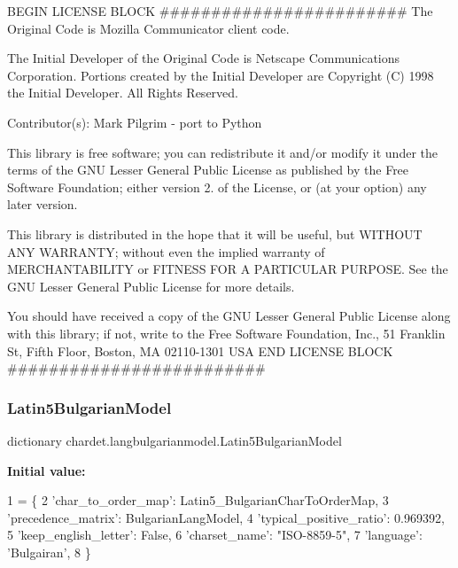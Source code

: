 B\+E\+G\+IN L\+I\+C\+E\+N\+SE B\+L\+O\+CK \#\#\#\#\#\#\#\#\#\#\#\#\#\#\#\#\#\#\#\#\#\#\#\# The Original Code is Mozilla Communicator client code. 

The Initial Developer of the Original Code is Netscape Communications Corporation. Portions created by the Initial Developer are Copyright (C) 1998 the Initial Developer. All Rights Reserved.

Contributor(s)\+: Mark Pilgrim -\/ port to Python

This library is free software; you can redistribute it and/or modify it under the terms of the G\+NU Lesser General Public License as published by the Free Software Foundation; either version 2. of the License, or (at your option) any later version.

This library is distributed in the hope that it will be useful, but W\+I\+T\+H\+O\+UT A\+NY W\+A\+R\+R\+A\+N\+TY; without even the implied warranty of M\+E\+R\+C\+H\+A\+N\+T\+A\+B\+I\+L\+I\+TY or F\+I\+T\+N\+E\+SS F\+OR A P\+A\+R\+T\+I\+C\+U\+L\+AR P\+U\+R\+P\+O\+SE. See the G\+NU Lesser General Public License for more details.

You should have received a copy of the G\+NU Lesser General Public License along with this library; if not, write to the Free Software Foundation, Inc., 51 Franklin St, Fifth Floor, Boston, MA 02110-\/1301 U\+SA E\+ND L\+I\+C\+E\+N\+SE B\+L\+O\+CK \#\#\#\#\#\#\#\#\#\#\#\#\#\#\#\#\#\#\#\#\#\#\#\#\# \mbox{\label{namespacechardet_1_1langbulgarianmodel_a6eadecfa2ffa667048b345f7c821539f}} 
\subsubsection{\texorpdfstring{Latin5\+Bulgarian\+Model}{Latin5BulgarianModel}}
{\footnotesize\ttfamily dictionary chardet.\+langbulgarianmodel.\+Latin5\+Bulgarian\+Model}

{\bfseries Initial value\+:}
\begin{DoxyCode}
1 =  \{
2   \textcolor{stringliteral}{'char\_to\_order\_map'}: Latin5\_BulgarianCharToOrderMap,
3   \textcolor{stringliteral}{'precedence\_matrix'}: BulgarianLangModel,
4   \textcolor{stringliteral}{'typical\_positive\_ratio'}: 0.969392,
5   \textcolor{stringliteral}{'keep\_english\_letter'}: \textcolor{keyword}{False},
6   \textcolor{stringliteral}{'charset\_name'}: \textcolor{stringliteral}{"ISO-8859-5"},
7   \textcolor{stringliteral}{'language'}: \textcolor{stringliteral}{'Bulgairan'},
8 \}
\end{DoxyCode}
\mbox{\label{namespacechardet_1_1langbulgarianmodel_a7a813eab0e687a1a6aa373d21806a16c}} 
